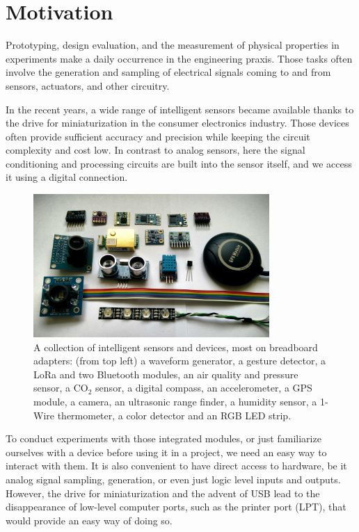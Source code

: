 \chapter{Motivation}

Prototyping, design evaluation, and the measurement of physical properties in experiments make a daily occurrence in the engineering praxis. Those tasks often involve the generation and sampling of electrical signals coming to and from sensors, actuators, and other circuitry. 

In the recent years, a wide range of intelligent sensors became available thanks to the drive for miniaturization in the consumer electronics industry. Those devices often provide sufficient accuracy and precision while keeping the circuit complexity and cost low. In contrast to analog sensors, here the signal conditioning and processing circuits are built into the sensor itself, and we access it using a digital connection.

\begin{figure}[H]
	\centering
	\includegraphics[width=0.8\textwidth] {img/inteligent-sensors.jpg}
	\caption[A collection of intelligent sensors and devices]{A collection of intelligent sensors and devices, most on breadboard adapters: (from top left) a waveform generator, a gesture detector, a LoRa and two Bluetooth modules, an air quality and pressure sensor, a CO$_2$ sensor, a digital compass, an accelerometer, a GPS module, a camera, an ultrasonic range finder, a humidity sensor, a 1-Wire thermometer, a color detector and an RGB LED strip.}
\end{figure}

To conduct experiments with those integrated modules, or just familiarize ourselves with a device before using it in a project, we need an easy way to interact with them. It is also convenient to have direct access to hardware, be it analog signal sampling, generation, or even just logic level inputs and outputs. However, the drive for miniaturization and the advent of \gls{USB} lead to the disappearance of low-level computer ports, such as the printer port (LPT), that would provide an easy way of doing so.


